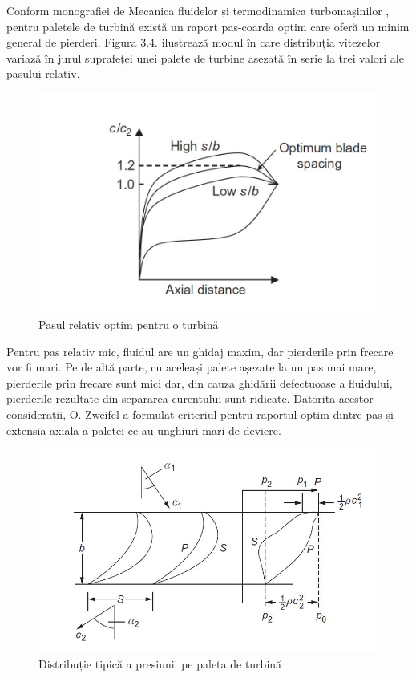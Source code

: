 Conform monografiei de Mecanica fluidelor și termodinamica turbomașinilor \cite{hall2013fluid}, pentru paletele de turbină există un raport pas-coarda optim care oferă un minim general de pierderi. Figura 3.4. ilustrează modul în care distribuția vitezelor variază în jurul suprafeței unei palete de turbine așezată în serie la trei valori ale pasului relativ.

\begin{figure}[h]
	\centering
	\includegraphics[scale=0.35]{figures/pasul_relativ_optim.jpg}
	\caption{Pasul relativ optim pentru o turbină \cite{hall2013fluid}}
	\label{Pasul relativ optim pentru o turbină}
\end{figure}

Pentru pas relativ mic, fluidul are un ghidaj maxim, dar pierderile prin frecare vor fi mari. Pe de altă parte, cu aceleași palete așezate la un pas mai mare, pierderile prin frecare sunt mici dar, din cauza ghidării defectuoase a fluidului, pierderile rezultate din separarea curentului sunt ridicate. Datorita acestor considerații, O. Zweifel \cite{zweifel1945frage} a formulat criteriul pentru raportul optim dintre pas și extensia axiala a paletei ce au unghiuri mari de deviere.

\begin{figure}[h]
	\centering
	\includegraphics[scale=0.5]{figures/distributia_presiunii.jpg}
	\caption{Distribuție tipică a presiunii pe paleta de turbină \cite{hall2013fluid}}
	\label{Distribuție tipică a presiunii pe paleta de turbină}
\end{figure}

